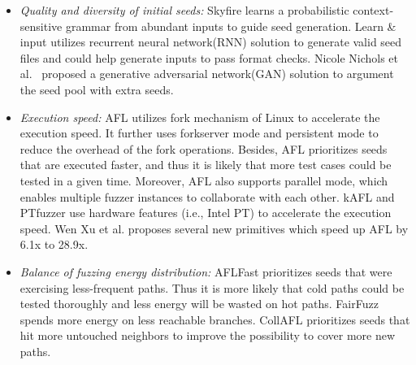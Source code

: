 
\begin{itemize}

\item  \textit{Quality and diversity of initial seeds:} Skyfire \cite{wang2017skyfire} learns a probabilistic context-sensitive grammar from abundant inputs to guide seed generation. Learn \& input \cite{godefroid2017learn} utilizes recurrent neural network(RNN) solution to generate valid seed files and could help generate inputs to pass format checks. Nicole Nichols et al.~\cite{lv2018smartseed} proposed a generative adversarial network(GAN) solution to argument the seed pool with extra seeds.

\item  \textit{Execution speed:} AFL utilizes fork mechanism of Linux to accelerate the execution speed. It further uses forkserver mode and persistent mode to reduce the overhead of the fork operations. Besides, AFL prioritizes seeds that are executed faster, and thus it is likely that more test cases could be tested in a given time. Moreover, AFL also supports parallel mode, which enables multiple fuzzer instances to collaborate with each other. kAFL\cite{schumilo2017kafl} and PTfuzzer\cite{zhang2018ptfuzz} use hardware features (i.e., Intel PT) to accelerate the execution speed. Wen Xu et al. proposes several new primitives \cite{xu2017designing} which speed up AFL by 6.1x to 28.9x. 
 
\item \textit{Balance of fuzzing energy distribution:} AFLFast \cite{bohme2016aflfast} prioritizes seeds that were exercising less-frequent paths. Thus it is more likely that cold paths could be tested thoroughly and less energy will be wasted on hot paths.
FairFuzz \cite{fairfuzz} spends more energy on less reachable branches. CollAFL\cite{gancollafl} prioritizes seeds that hit more untouched neighbors to improve the possibility to cover more new paths.
\end{itemize}


